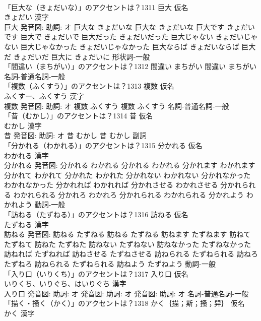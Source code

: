 \documentclass[8pt]{extreport}
\begin{document}
\begin{CJK}{UTF8}{min}
\\	「巨大な（きょだいな）」のアクセントは？1311	巨大 仮名　
\\	きょだい 漢字　
\\	巨大 発音図: 助詞: オ	巨大な きょだいな		巨大な きょだいな 巨大です きょだいです 巨大で きょだいで 巨大だった きょだいだった 巨大じゃない きょだいじゃない 巨大じゃなかった きょだいじゃなかった 巨大ならば きょだいならば 巨大だ きょだいだ 巨大に きょだいに				形状詞-一般 
\\	「間違い（まちがい）」のアクセントは？1312		間違い まちがい		間違い まちがい				名詞-普通名詞-一般 
\\	「複数（ふくすう）」のアクセントは？1313	複数 仮名　
\\	ふくすー、ふくすう 漢字　
\\	複数 発音図: 助詞: オ	複数 ふくすう		複数 ふくすう				名詞-普通名詞-一般 
\\	「昔（むかし）」のアクセントは？1314	昔 仮名　
\\	むかし 漢字　
\\	昔 発音図: 助詞: オ	昔 むかし		昔 むかし				副詞 
\\	「分かれる（わかれる）」のアクセントは？1315	分かれる 仮名　
\\	わかれる 漢字　
\\	分かれる 発音図:	分かれる わかれる		分かれる わかれる 分かれます わかれます 分かれて わかれて 分かれた わかれた 分かれない わかれない 分かれなかった わかれなかった 分かれれば わかれれば 分かれさせる わかれさせる 分かれられる わかれられる 分かれろ わかれろ 分かれられる わかれられる 分かれよう わかれよう				動詞-一般 
\\	「訪ねる（たずねる）」のアクセントは？1316	訪ねる 仮名　
\\	たずねる 漢字　
\\	訪ねる 発音図:	訪ねる たずねる		訪ねる たずねる 訪ねます たずねます 訪ねて たずねて 訪ねた たずねた 訪ねない たずねない 訪ねなかった たずねなかった 訪ねれば たずねれば 訪ねさせる たずねさせる 訪ねられる たずねられる 訪ねろ たずねろ 訪ねられる たずねられる 訪ねよう たずねよう				動詞-一般 
\\	「入り口（いりくち）」のアクセントは？1317	入り口 仮名　
\\	いりくち、いりぐち、はいりぐち 漢字　
\\	入り口 発音図: 助詞: オ 発音図: 助詞: オ 発音図: 助詞: オ							名詞-普通名詞-一般 
\\	「描く・掻く（かく）」のアクセントは？1318	かく｛描；斯；掻；舁｝ 仮名　
\\	かく 漢字　

\end{CJK}
\end{document}
